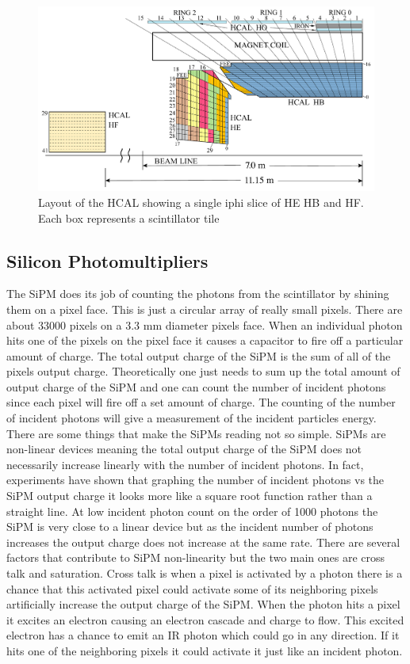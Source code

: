 \begin{figure}
\centering
\includegraphics[width=\linewidth]{Figures/Depthsegmentation.pdf}
\caption{Layout of the HCAL showing a single iphi slice of HE HB and HF. Each box represents a scintillator tile}
\label{fig:Depth}
\end{figure}

\subsection{Silicon Photomultipliers}
The SiPM does its job of counting the photons from the scintillator by shining them on a pixel face. This is just a circular array of really small pixels. There are about 33000 pixels on a 3.3 mm diameter pixels face. When an individual photon hits one of the pixels on the pixel face it causes a capacitor to fire off a particular amount of charge. The total output charge of the SiPM is the sum of all of the pixels output charge. Theoretically one just needs to sum up the total amount of output charge of the SiPM and one can count the number of incident photons since each pixel will fire off a set amount of charge. The counting of the number of incident photons will give a measurement of the incident particles energy. There are some things that make the SiPMs reading not so simple. SiPMs are non-linear devices meaning the total output charge of the SiPM does not necessarily increase linearly with the number of incident photons. In fact, experiments have shown that graphing the number of incident photons vs the SiPM output charge it looks more like a square root function rather than a straight line. At low incident photon count on the order of 1000 photons the SiPM is very close to a linear device but as the incident number of photons increases the output charge does not increase at the same rate. There are several factors that contribute to SiPM non-linearity but the two main ones are cross talk and saturation. Cross talk is when a pixel is activated by a photon there is a chance that this activated pixel could activate some of its neighboring pixels artificially increase the output charge of the SiPM. When the photon hits a pixel it excites an electron causing an electron cascade and charge to flow. This excited electron has a chance to emit an IR photon which could go in any direction. If it hits one of the neighboring pixels it could activate it just like an incident photon. 

